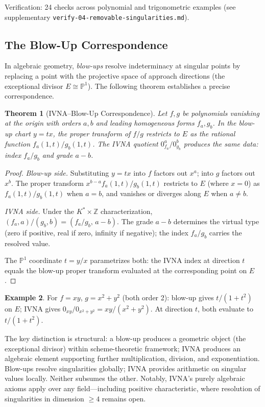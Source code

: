 \documentclass[12pt]{article}
\newtheorem{theorem}{Theorem}[section]
\theoremstyle{definition}
\newtheorem{example}[theorem]{Example}
\theoremstyle{remark}
\newcommand{\vz}[1]{0_{#1}}             %
\newcommand{\vzn}[2]{0^{#1}_{#2}}       %
\begin{document}
Verification: 24 checks across polynomial and trigonometric examples
(see supplementary \texttt{verify-04-removable-singularities.md}).

\subsection{The Blow-Up Correspondence}
\label{subsec:blowup}

In algebraic geometry, \emph{blow-ups} resolve indeterminacy at singular
points by replacing a point with the projective space of approach
directions (the exceptional divisor $E \cong \mathbb{P}^1$). The
following theorem establishes a precise correspondence.

\begin{theorem}[IVNA--Blow-Up Correspondence]
\label{thm:blowup}
Let $f, g$ be polynomials vanishing at the origin with orders $a, b$
and leading homogeneous forms $f_a, g_b$. In the blow-up chart $y = tx$,
the proper transform of $f/g$ restricts to $E$ as the rational function
$f_a(1,t)/g_b(1,t)$. The IVNA quotient $\vzn{a}{f_a}/\vzn{b}{g_b}$
produces the same data: index $f_a/g_b$ and grade $a - b$.
\end{theorem}

\begin{proof}
\emph{Blow-up side.} Substituting $y = tx$ into $f$ factors out $x^a$;
into $g$ factors out $x^b$. The proper transform $x^{b-a} f_a(1,t)/g_b(1,t)$
restricts to $E$ (where $x = 0$) as $f_a(1,t)/g_b(1,t)$ when $a = b$,
and vanishes or diverges along $E$ when $a \neq b$.

\emph{IVNA side.} Under the $K^* \times \mathbb{Z}$ characterization,
$(f_a, a) / (g_b, b) = (f_a/g_b,\, a - b)$. The grade $a - b$
determines the virtual type (zero if positive, real if zero, infinity
if negative); the index $f_a/g_b$ carries the resolved value.

The $\mathbb{P}^1$ coordinate $t = y/x$ parametrizes both: the IVNA
index at direction $t$ equals the blow-up proper transform evaluated at
the corresponding point on $E$.
\end{proof}

\begin{example}
For $f = xy$, $g = x^2 + y^2$ (both order 2): blow-up gives
$t/(1+t^2)$ on $E$; IVNA gives $\vz{xy}/\vz{x^2+y^2} = xy/(x^2+y^2)$.
At direction $t$, both evaluate to $t/(1+t^2)$.
\end{example}

The key distinction is structural: a blow-up produces a geometric
object (the exceptional divisor) within scheme-theoretic framework;
IVNA produces an algebraic element supporting further multiplication,
division, and exponentiation. Blow-ups resolve singularities globally;
IVNA provides arithmetic on singular values locally. Neither subsumes
the other. Notably, IVNA's purely algebraic axioms apply over any
field---including positive characteristic, where resolution of
singularities in dimension $\geq 4$ remains open.
\end{document}
